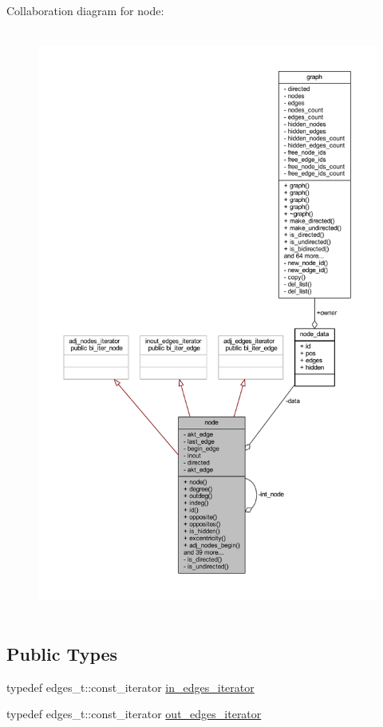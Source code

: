 Collaboration diagram for node\+:\nopagebreak
\begin{figure}[H]
\begin{center}
\leavevmode
\includegraphics[height=550pt]{classnode__coll__graph}
\end{center}
\end{figure}
\subsection*{Public Types}
\begin{DoxyCompactItemize}
\item 
typedef edges\+\_\+t\+::const\+\_\+iterator \mbox{\hyperlink{classnode_a9a96be92add7c1a2771bcd0431ebf8ab}{in\+\_\+edges\+\_\+iterator}}
\item 
typedef edges\+\_\+t\+::const\+\_\+iterator \mbox{\hyperlink{classnode_a90e17ed34de55072e8077f4367499a98}{out\+\_\+edges\+\_\+iterator}}
\end{DoxyCompactItemize}
